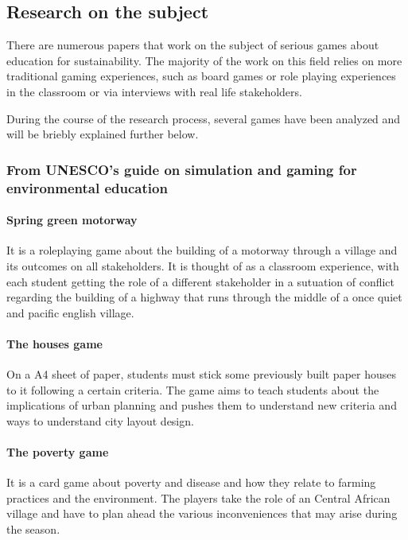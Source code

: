 \subsection{Research on the subject}

There are numerous papers  that work on the subject of serious games about education for sustainability. The majority of the work on this field relies on more traditional gaming experiences, such as board games or role playing experiences in the classroom or via interviews with real life stakeholders.

During the course of the research process, several games have been analyzed and
will be briebly explained further below.

\subsubsection{From UNESCO's guide on simulation and gaming for environmental education
\cite{Taylor1983}}

\paragraph{Spring green motorway}
It is a roleplaying game about the building of a motorway through a village
and its outcomes on all stakeholders. It is thought of as a classroom
experience, with each student getting the role of a different stakeholder
in a sutuation of conflict regarding the building of a highway that runs
through the middle of a once quiet and pacific english village.

\paragraph{The houses game}
On a A4 sheet of paper, students must stick some previously built
paper houses to it following a certain criteria. The game aims to teach students
about the implications of urban planning and pushes them to understand new
criteria and ways to understand city layout design.

\paragraph{The poverty game}
It is a card game about poverty and disease and how they relate to farming
practices and the environment. The players take the role of an Central African
village and have to plan ahead the various inconveniences that may arise during
the season.

